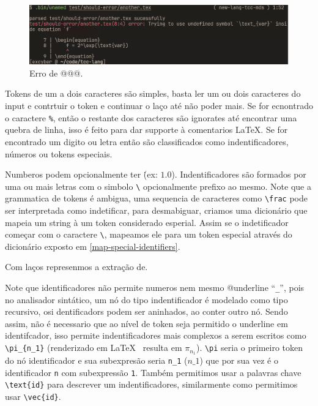 \begin{figure}[H]
    \caption{\label{error-undefined-symbol} \small Erro de @@@.}
    \begin{center}
        \includegraphics[scale=0.5]{./Imagens/error-undefined-symbol.png}
    \end{center}
\end{figure}

Tokens de um a dois caracteres são simples, basta ler um ou dois caracteres do input e contrtuir o token e continuar o laço até não poder mais. Se for ecnontrado o caractere \texttt{\%}, então o restante dos caracteres são ignorates até encontrar uma quebra de linha, isso é feito para dar supporte à comentarios \LaTeX{}.
Se for encontrado um digito ou letra então são classificados como indentificadores, números ou tokens especiais.

Numberos podem opcionalmente ter \. (ex: $1.0$). Indentificadores são formados por uma ou mais letras com o simbolo \verb"\" opcionalmente prefixo ao mesmo. Note que a grammatica de tokens é ambigua, uma sequencia de caracteres como \verb"\frac" pode ser interpretada como indetificar, para desmabiguar, criamos uma dicionário que mapeia um string à um token considerado esperial. Assim se o indetificador começar com o caractere \verb"\", mapeamos ele para um token especial através do dicionário exposto em \autoref{map-special-identifiers}.

Com laços represenmos a extração de.

\label{lexer-subexpression}
Note que identificadores não permite numeros nem mesmo @underline ``\verb|_|'', pois  no analisador sintático, um nó do tipo indentificador é modelado como tipo recursivo, osi dentificadors podem ser aninhados, ao  conter outro nó. Sendo assim, não é necessario que ao nível de token seja permitido o underline em identifcador, isso permite indentificadores mais complexos a serem escritos como \verb|\pi_{n_1}| (renderizado em \LaTeX{} \ resulta em $\pi_{n_1}$). \verb"\pi"  seria o primeiro token do nó identificador e sua subexpresão seria \verb"n_1" ($n\_1$) que por sua vez é o identificador \verb"n" com subexpressão \verb"1". Também permitimos usar a palavras chave \verb"\text{id}" para descrever um indentificadores, similarmente como permitimos usar \verb"\vec{id}".


